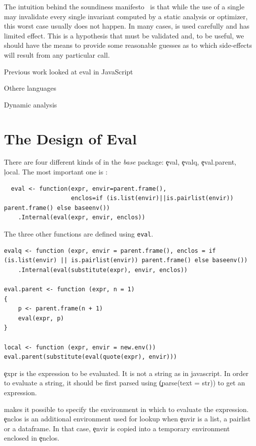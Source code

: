 \documentclass[conference]{IEEEtran}
\begin{document}
The intuition behind the soundiness manifesto~\cite{soundy} is that while
the use of a single \eval may invalidate every single invariant computed by
a static analysis or optimizer, this worst case usually does not happen.  In
many cases, \eval is used carefully and has limited effect. This is a
hypothesis that must be validated and, to be useful, we should have the
means to provide some reasonable guesses as to which side-effects will
result from any particular \eval call.

Previous work looked at eval in JavaScript

Othere languages

Dynamic analysis

\section{The Design of Eval}

There are four different kinds of \eval in the \emph{base} package:
\c{eval}, \c{evalq}, \c{eval.parent}, \c{local}.  The most important one is
\eval:

\begin{lstlisting}
  eval <- function(expr, envir=parent.frame(),
                   enclos=if (is.list(envir)||is.pairlist(envir)) parent.frame() else baseenv())  
	.Internal(eval(expr, envir, enclos))
\end{lstlisting}




The three other functions are defined using \lstinline|eval|.

\begin{lstlisting}
evalq <- function (expr, envir = parent.frame(), enclos = if (is.list(envir) || is.pairlist(envir)) parent.frame() else baseenv())  
	.Internal(eval(substitute(expr), envir, enclos))
	
eval.parent <- function (expr, n = 1) 
{
	p <- parent.frame(n + 1)
	eval(expr, p)
}

local <- function (expr, envir = new.env()) eval.parent(substitute(eval(quote(expr), envir)))
\end{lstlisting}


\c{expr} is the expression to be evaluated. It is not a string as in javascript. In order to evaluate a string, it should be first parsed using \c(parse(text = str)) to get an expression.

\eval makes it possible to specify the environment in which to evaluate the expression. \c{enclos} is an additional environment used for lookup when \c{envir} is a list, a pairlist or a dataframe. In that case, \c{envir} is copied into a temporary environment enclosed in \c{enclos}.
\end{document}
